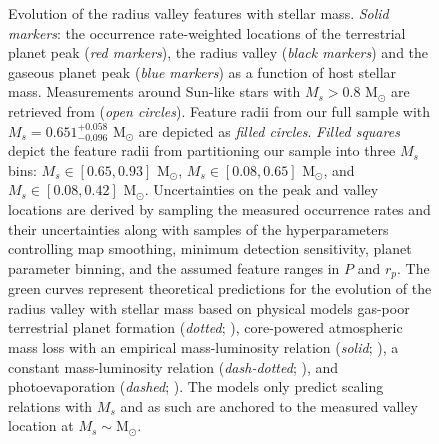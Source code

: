 \documentclass[twocolumn]{emulateapj}
\begin{document}
\begin{figure}
  \centering
  \caption{Evolution of the radius valley features with stellar mass. \emph{Solid markers}:
    the occurrence rate-weighted locations of the terrestrial planet peak (\emph{red markers}), the
    radius valley (\emph{black markers}) and the gaseous planet peak (\emph{blue markers})
    as a function of host stellar mass. Measurements around Sun-like stars with $M_s>0.8$ M$_{\odot}$ are
    retrieved from \cite{fulton18} (\emph{open circles}). Feature radii from our full sample with
    $M_s = 0.651^{+0.058}_{-0.096}$ M$_{\odot}$ are depicted as \emph{filled circles}. \emph{Filled squares}
    depict the feature radii from partitioning our sample into three $M_s$ bins: $M_s \in [0.65,0.93]$ M$_{\odot}$,
    $M_s \in [0.08,0.65]$ M$_{\odot}$, and $M_s \in [0.08,0.42]$ M$_{\odot}$. Uncertainties on the
    peak and valley locations are derived by sampling the measured occurrence rates and their uncertainties along
    with samples of the hyperparameters controlling map smoothing, minimum detection sensitivity, planet parameter
    binning, and the assumed feature ranges in $P$ and $r_p$. The green
    curves represent theoretical predictions for the evolution of the radius valley with stellar mass based on
    physical models gas-poor terrestrial planet formation (\emph{dotted}; \citealt{lopez18}),
    core-powered atmospheric mass loss
    with an empirical mass-luminosity relation (\emph{solid}; \citealt{gupta19b}), a constant mass-luminosity
    relation (\emph{dash-dotted}; \citealt{gupta19b}), and photoevaporation (\emph{dashed}; \citealt{wu19}).
    The models only predict scaling relations with $M_s$ and as such are anchored to the measured valley location
    at $M_s \sim \text{M}_{\odot}$.}
  \label{fig:rpvMs}
\end{figure}
\end{document}
